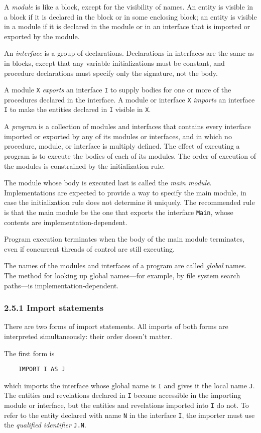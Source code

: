\documentclass[10pt]{article}
\begin{document}
A \emph{module} is like a block, except for the visibility of names.  An entity
is visible in a block if it is declared in the block or in some enclosing
block; an entity is visible in a module if it is declared in the module or in
an interface that is imported or exported by the module.

An \emph{interface} is a group of declarations.  Declarations in interfaces
are the same as in blocks, except that any variable initializations must be
constant, and procedure declarations must specify only the signature, not the
body.

A module \verb|X| \emph{exports} an interface \verb|I| to supply bodies for
one or more of the procedures declared in the interface.  A module or
interface \verb|X| \emph{imports} an interface \verb|I| to make the entities
declared in \verb|I| visible in \verb|X|.

A \emph{program} is a collection of modules and interfaces that contains every
interface imported or exported by any of its modules or interfaces, and in
which no procedure, module, or interface is multiply defined.  The effect of
executing a program is to execute the bodies of each of its modules.  The
order of execution of the modules is constrained by the initialization rule.

The module whose body is executed last is called the \emph{main module}.
Implementations are expected to provide a way to specify the main module, in
case the initialization rule does not determine it uniquely.  The recommended
rule is that the main module be the one that exports the interface
\verb|Main|, whose contents are implementation-dependent.

Program execution terminates when the body of the main module terminates, even
if concurrent threads of control are still executing.

The names of the modules and interfaces of a program are called \emph{global}
names.  The method for looking up global names---for example, by file system
search paths---is implementation-dependent.

\subsubsection*{2.5.1 Import statements}

There are two forms of import statements.  All imports of both forms are
interpreted simultaneously: their order doesn't matter.

The first form is
\begin{verbatim}
    IMPORT I AS J
\end{verbatim}
which imports the interface whose global name is \verb|I| and gives it the
local name \verb|J|.  The entities and revelations declared in \verb|I| become
accessible in the importing module or interface, but the entities and
revelations imported into \verb|I| do not.  To refer to the entity declared
with name \verb|N| in the interface \verb|I|, the importer must use the
\emph{qualified identifier} \verb|J.N|.
\end{document}
